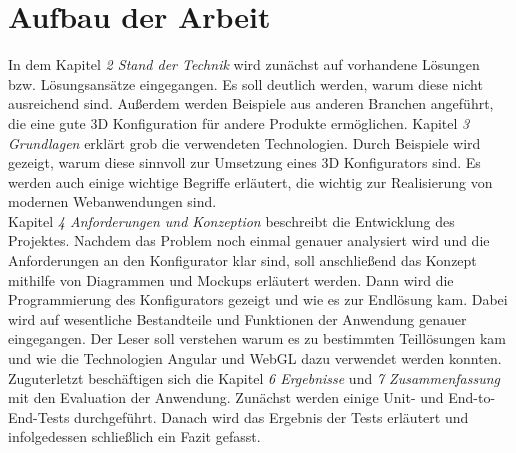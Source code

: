 \section{Aufbau der Arbeit}
\label{sec:aufbau}
%
In dem Kapitel \textit{2 Stand der Technik} wird zunächst auf vorhandene Lösungen bzw. Lösungsansätze eingegangen. Es soll deutlich werden, warum diese nicht ausreichend sind. Außerdem werden Beispiele aus anderen Branchen angeführt, die eine gute 3D Konfiguration für andere Produkte ermöglichen. Kapitel \textit{3 Grundlagen} erklärt grob die verwendeten Technologien. Durch Beispiele wird gezeigt, warum diese sinnvoll zur Umsetzung eines 3D Konfigurators sind. Es werden auch einige wichtige Begriffe erläutert, die wichtig zur Realisierung von modernen Webanwendungen sind.\\
%
Kapitel \textit{4 Anforderungen und Konzeption} beschreibt die Entwicklung des Projektes. Nachdem das Problem noch einmal genauer analysiert wird und die Anforderungen an den Konfigurator klar sind, soll anschließend das Konzept mithilfe von Diagrammen und Mockups erläutert werden. 
Dann wird die Programmierung des Konfigurators gezeigt und wie es zur Endlösung kam. Dabei wird auf wesentliche Bestandteile und Funktionen der Anwendung genauer eingegangen. Der Leser soll verstehen warum es zu bestimmten Teillösungen kam und wie die Technologien Angular und WebGL dazu verwendet werden konnten. \\
Zuguterletzt beschäftigen sich die Kapitel \textit{6 Ergebnisse} und \textit{7 Zusammenfassung} mit den Evaluation der Anwendung. Zunächst werden einige Unit- und End-to-End-Tests durchgeführt. Danach wird das Ergebnis der Tests erläutert und infolgedessen schließlich ein Fazit gefasst.
%